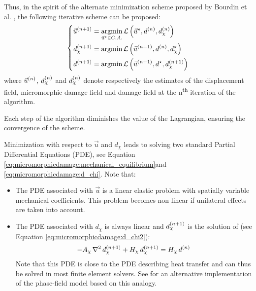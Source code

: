 Thus, in the spirit of the alternate minimization scheme proposed by
Bourdin et al. \cite{bourdin_numerical_2000}, the following iterative scheme
can be proposed:
%
%
%
\begin{equation}
  \left\{
  \begin{aligned}
  \iter{n+1}{\vec{u}} &= \underset{\vec{u}^{\star}\in C.A.}{\argmin}\, \mathcal{L}\paren{\vec{u}^{\star},\iter{n}{d},\iter{n}{d_{\chi}}}\\
  \iter{n+1}{d_{\chi}} &= \argmin \,\mathcal{L}\paren{\iter{n+1}{\vec{u}},\iter{n}{d},d_{\chi}^{\star}} \\
  \iter{n+1}{d} &= \argmin \,\mathcal{L}\paren{\iter{n+1}{\vec{u}},d^{\star},\iter{n+1}{d_{\chi}}} \\
  \end{aligned}
  \right.
\end{equation}
where \(\iter{n}{\vec{u}}\), \(\iter{n}{d_{\chi}}\) and
\(\iter{n}{d_{\chi}}\) denote respectively the estimates of the
displacement field, micromorphic damage field and damage field at the
n\textsuperscript{th} iteration of the algorithm.

Each step of the algorithm diminishes the value of the Lagrangian,
ensuring the convergence of the scheme.

Minimization with respect to \(\vec{u}\) and \(d_{\chi}\) leads to
solving two standard Partial Differential Equations (PDE), see Equation
\eqref{eq:micromorphicdamage:mechanical_equilibrium}and
\eqref{eq:micromorphicdamage:d_chi}. Note that:
%
%
%
\begin{itemize}
  \item The PDE associated with \(\vec{u}\) is a linear elastic problem with
  spatially variable mechanical coefficients. This problem becomes non
  linear if unilateral effects are taken into account.
  \item The PDE associated with \(d_{\chi}\) is always linear and
  \(\iter{n+1}{d_{\chi}}\) is the solution of (see Equation
  \eqref{eq:micromorphicdamage:d_chi2}):
  \[
  -A_{\chi}\,\LaplacianOperator\,\iter{n+1}{d_{\chi}}+H_{\chi}\,\iter{n+1}{d_{\chi}}=
  H_{\chi}\,\iter{n}{d}
  \]
  Note that this PDE is close to the PDE describing heat transfer and can
  thus be solved in most finite element solvers. See \cite{azinpour_simple_2018}
  for an alternative implementation of the phase-field model based on this analogy.
\end{itemize}

